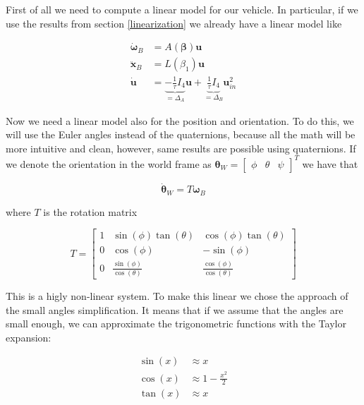 First of all we need to compute a linear model for our vehicle. In particular, if we use the results from section \ref{linearization} we already have a linear model like

\begin{align}
	\dot{\boldsymbol{\omega}}_B &= A(\boldsymbol{\beta})\mathbf{u} \label{eq:MPCdyn1} \\
	\ddot{\mathbf{x}}_B &= L(\beta_1)\mathbf{u} \label{eq:MPCdyn2} \\
	\dot{\mathbf{u}} &= \underbrace{-\frac{1}{\tau}I_4}_{=\Delta_A}\mathbf{u} + \underbrace{\frac{1}{\tau}I_4}_{=\Delta_B}\mathbf{u}_{in}^2 \label{eq:MPCdyn3}
\end{align}

\noindent Now we need a linear model also for the position and orientation. To do this, we will use the Euler angles instead of the quaternions, because all the math will be more intuitive and clean, however, same results are possible using quaternions. If we denote the orientation in the world frame as $\boldsymbol{\theta}_W = \begin{bmatrix} \phi & \theta & \psi \end{bmatrix}^T$ we have that

\begin{equation}
	\dot{\boldsymbol{\theta}}_W = T\boldsymbol{\omega}_B
	\label{eq:thetaDynamic}
\end{equation}

\noindent where $T$ is the rotation matrix

\begin{equation}
	T = 
	\begin{bmatrix}
		1 & \sin(\phi)\tan(\theta)          & \cos(\phi)\tan(\theta) \\
		0 & \cos(\phi)                      & -\sin(\phi)            \\
		0 & \frac{\sin(\phi)}{\cos(\theta)} & \frac{\cos(\phi)}{\cos(\theta)} 
	\end{bmatrix}
\end{equation}

\noindent This is a higly non-linear system. To make this linear we chose the approach of the small angles simplification. It means that if we assume that the angles are small enough, we can approximate the trigonometric functions with the Taylor expansion:

\begin{align*}
	\sin(x) &\approx x \\
	\cos(x) &\approx 1-\frac{x^2}{2} \\
	\tan(x) &\approx x \\
\end{align*}

